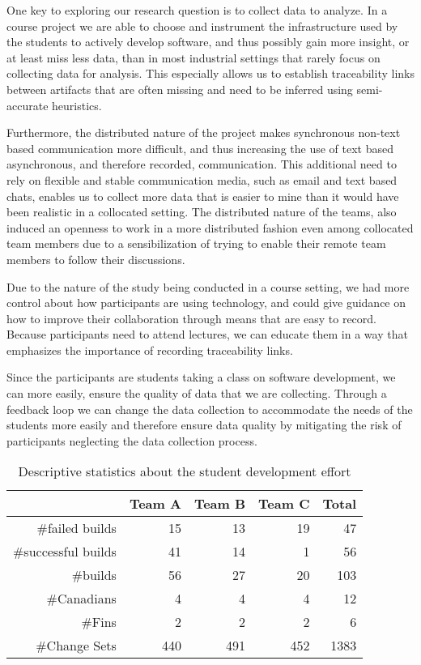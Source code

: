 One key to exploring our research question is to collect data to analyze.
In a course project we are able to choose and instrument the infrastructure used by the students to actively develop software, and thus possibly gain more insight, or at least miss less data, than in most industrial settings that rarely focus on collecting data for analysis.
This especially allows us to establish traceability links between artifacts that are often missing and need to be inferred using semi-accurate heuristics.

Furthermore, the distributed nature of the project makes synchronous non-text based communication more difficult, and thus increasing the use of text based asynchronous, and therefore recorded, communication.
This additional need to rely on flexible and stable communication media, such as email and text based chats, enables us to collect more data that is easier to mine than it would have been realistic in a collocated setting.
The distributed nature of the teams, also induced an openness to work in a more distributed fashion even among collocated team members due to a sensibilization of trying to enable their remote team members to follow their discussions.

Due to the nature of the study being conducted in a course setting, we had more control about how participants are using technology, and could give guidance on how to improve their collaboration through means that are easy to record.
Because participants need to attend lectures, we can educate them in a way that emphasizes the importance of recording traceability links.

Since the participants are students taking a class on software development, we can more easily, ensure the quality of data that we are collecting.
Through a feedback loop we can change the data collection to accommodate the needs of the students more easily and therefore ensure data quality by mitigating the risk of participants neglecting the data collection process. 

\begin{table}[t]
\centering
\caption{Descriptive statistics about the student development effort}
\begin{tabular}{rrrrr}
\toprule
& Team A & Team B & Team C & Total\\
\midrule
\#failed builds &15&13&19&47\\
\#successful builds &41&14&1&56\\ 
\#builds & 56 & 27 & 20 & 103 \\
\#Canadians & 4 & 4 & 4 & 12\\
\#Fins & 2 & 2 & 2 & 6\\
\#Change Sets & 440 & 491 &  452& 1383\\
\bottomrule
\end{tabular}
\label{tab:gsd:desc:stats}
\end{table}

